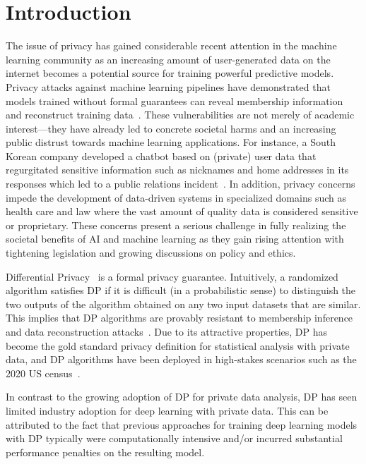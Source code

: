 \chapter{Introduction}

The issue of privacy has gained considerable recent attention in the machine learning community as an increasing amount of user-generated data on the internet becomes a potential source for training powerful predictive models.
Privacy attacks against machine learning pipelines have demonstrated that models trained without formal guarantees can reveal membership information and reconstruct training data~\cite{shokri2017membership,carlini2021extracting}.
These vulnerabilities are not merely of academic interest---they have already led to concrete societal harms and an increasing public distrust towards machine learning applications.
For instance, a South Korean company developed a chatbot based on (private) user data that regurgitated sensitive information such as nicknames and home addresses in its responses which led to a public relations incident~\cite{sk-chatbot}.
In addition, privacy concerns impede the development of data-driven systems in specialized domains such as health care and law where the vast amount of quality data is considered sensitive or proprietary.
These concerns present a serious challenge in fully realizing the societal benefits of AI and machine learning as they gain rising attention with tightening legislation and growing discussions on policy and ethics. 

Differential Privacy~\cite[DP]{dwork2014algorithmic} is a formal privacy guarantee.
Intuitively, a randomized algorithm satisfies DP if it is difficult (in a probabilistic sense) to distinguish the two outputs of the algorithm obtained on any two input datasets that are similar.
This implies that DP algorithms are provably resistant to membership inference~\cite{yeom2018privacy,wasserman2010statistical} and data reconstruction attacks~\cite{pmlr-v162-guo22c,hayes2023bounding}.
Due to its attractive properties, DP has become the gold standard privacy definition for statistical analysis with private data, and DP algorithms have been deployed in high-stakes scenarios such as the 2020 US census~\cite{us-census}.

In contrast to the growing adoption of DP for private data analysis, DP has seen limited industry adoption for deep learning with private data.
This can be attributed to the fact that previous approaches for training deep learning models with DP typically were computationally intensive and/or incurred substantial performance penalties on the resulting model.


